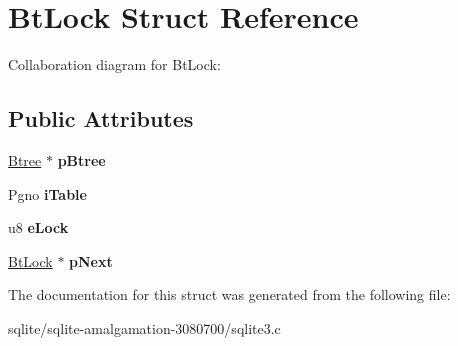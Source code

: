 \hypertarget{struct_bt_lock}{\section{Bt\+Lock Struct Reference}
\label{struct_bt_lock}
}


Collaboration diagram for Bt\+Lock\+:
\subsection*{Public Attributes}
\begin{DoxyCompactItemize}
\item 
\hypertarget{struct_bt_lock_ab9125b8e79d480b75f3af21cb2ab55c7}{\hyperlink{struct_btree}{Btree} $\ast$ {\bfseries p\+Btree}}\label{struct_bt_lock_ab9125b8e79d480b75f3af21cb2ab55c7}

\item 
\hypertarget{struct_bt_lock_a822efcf018d6c8eb343341cde5df980d}{Pgno {\bfseries i\+Table}}\label{struct_bt_lock_a822efcf018d6c8eb343341cde5df980d}

\item 
\hypertarget{struct_bt_lock_abe07b71018ee423e0d94b5cdba044b5c}{u8 {\bfseries e\+Lock}}\label{struct_bt_lock_abe07b71018ee423e0d94b5cdba044b5c}

\item 
\hypertarget{struct_bt_lock_ad42de86209c7aab43604c52a549b7bca}{\hyperlink{struct_bt_lock}{Bt\+Lock} $\ast$ {\bfseries p\+Next}}\label{struct_bt_lock_ad42de86209c7aab43604c52a549b7bca}

\end{DoxyCompactItemize}


The documentation for this struct was generated from the following file\+:\begin{DoxyCompactItemize}
\item 
sqlite/sqlite-\/amalgamation-\/3080700/sqlite3.\+c\end{DoxyCompactItemize}
